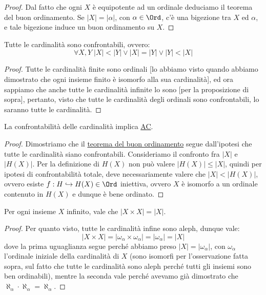 \documentclass[11pt]{scrartcl}
\begin{document}
\begin{proof}
	Dal fatto che ogni $X$ è equipotente ad un ordinale deduciamo il teorema del buon ordinamento. Se $|X| = |\alpha|$, con $\alpha \in \Ord$, c'è una bigezione tra $X$ ed $\alpha$, e tale bigezione induce un buon ordinamento su $X$.
\end{proof}

\begin{corollary}
	Tutte le cardinalità sono confrontabili, ovvero:
	\[ \forall X,Y \; |X| < |Y| \lor |X| = |Y| \lor |Y| < |X|
		\]
\end{corollary}

\begin{proof}
	Tutte le cardinalità finite sono ordinali [lo abbiamo visto quando abbiamo dimostrato che ogni insieme finito è isomorfo alla sua cardinalità], ed ora sappiamo che anche tutte le cardinalità infinite lo sono [per la proposizione di sopra], pertanto, visto che tutte le cardinalità degli ordinali sono confrontabili, lo saranno tutte le cardinalità.
\end{proof}

\begin{remark}
	La confrontabilità delle cardinalità implica \hyperref[ax9]{AC}.
\end{remark}

\begin{proof}
	Dimostriamo che il \hyperref[buon_ordinamento]{teorema del buon ordinamento} segue dall'ipotesi che tutte le cardinalità siano confrontabili. Consideriamo il confronto fra $|X|$ e $|H(X)|$.
	Per la definizione di $H(X)$ non può valere $|H(X)| \leq |X|$, quindi per ipotesi di confrontabilità totale, deve necessariamente valere che $|X| < |H(X)|$, ovvero esiste $f : H \hookrightarrow H(X) \in \Ord$ iniettiva, ovvero $X$ è isomorfo a un ordinale contenuto in $H(X)$ e dunque è bene ordinato.
\end{proof}

\begin{corollary}[AC $\implies |X \times X| = |X|$]
	Per ogni insieme $X$ infinito, vale che $|X \times X| = |X|$.
\end{corollary}

\begin{proof}
	Per quanto visto, tutte le cardinalità infine sono aleph, dunque vale:
	\[ |X \times X| = |\omega_\alpha \times \omega_\alpha| = |\omega_\alpha| = |X|
		\]
	dove la prima uguaglianza segue perché abbiamo preso $|X| = |\omega_\alpha|$, con $\omega_\alpha$ l'ordinale iniziale della cardinalità di $X$ (sono isomorfi per
	l'osservazione fatta sopra, sul fatto che tutte le cardinalità sono aleph perché tutti gli insiemi sono ben ordinabili), mentre la seconda vale perché avevamo già dimostrato che $\aleph_\alpha \cdot \aleph_\alpha = \aleph_\alpha$.
\end{proof}
\end{document}
